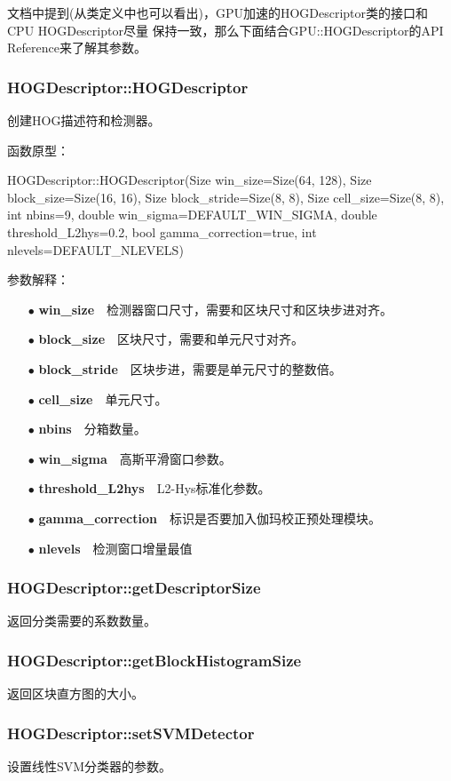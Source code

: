 \documentclass[10pt,technote,onecolumn,twoside]{IEEEtran}
\begin{document}
文档\cite{bib2}中提到(从类定义中也可以看出)，GPU加速的\textsf{HOGDescriptor}类的接口和\textsf{CPU HOGDescriptor}尽量
保持一致，那么下面结合\textsf{GPU::HOGDescriptor}的API Reference来了解其参数。

\subsubsection{HOGDescriptor::HOGDescriptor}
创建HOG描述符和检测器。

函数原型：

HOGDescriptor::HOGDescriptor(Size win\_size=Size(64, 128), Size block\_size=Size(16, 16), Size block\_stride=Size(8, 8), Size cell\_size=Size(8, 8), int nbins=9, double win\_sigma=DEFAULT\_WIN\_SIGMA, double threshold\_L2hys=0.2, bool gamma\_correction=true, int nlevels=DEFAULT\_NLEVELS)

参数解释：
\begin{enumerate}
\item[$\bullet$]\textbf{win\_size}~~检测器窗口尺寸，需要和区块尺寸和区块步进对齐。
\item[$\bullet$]\textbf{block\_size}~~区块尺寸，需要和单元尺寸对齐。
\item[$\bullet$]\textbf{block\_stride}~~区块步进，需要是单元尺寸的整数倍。
\item[$\bullet$]\textbf{cell\_size}~~单元尺寸。
\item[$\bullet$]\textbf{nbins}~~分箱数量。
\item[$\bullet$]\textbf{win\_sigma}~~高斯平滑窗口参数。
\item[$\bullet$]\textbf{threshold\_L2hys}~~L2-Hys标准化参数\cite{bib5}。
\item[$\bullet$]\textbf{gamma\_correction}~~标识是否要加入伽玛校正预处理模块。
\item[$\bullet$]\textbf{nlevels}~~检测窗口增量最值
\end{enumerate}
\subsubsection{HOGDescriptor::getDescriptorSize}
返回分类需要的系数数量。
\subsubsection{HOGDescriptor::getBlockHistogramSize}
返回区块直方图的大小。
\subsubsection{HOGDescriptor::setSVMDetector}
设置线性SVM分类器的参数。
\end{document}
